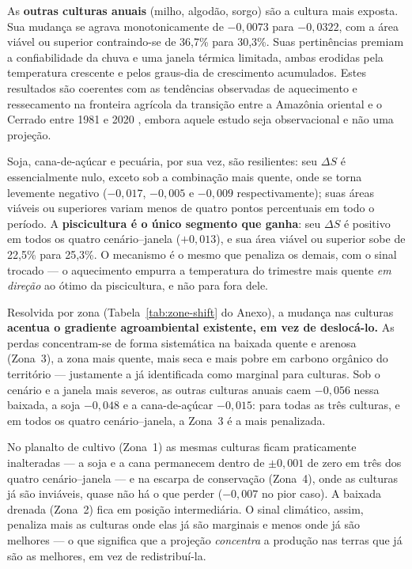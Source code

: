 As \textbf{outras culturas anuais} (milho, algodão, sorgo) são a cultura mais exposta. Sua
mudança se agrava monotonicamente de $-0{,}0073$ para $-0{,}0322$, com a área viável ou
superior contraindo-se de 36,7\% para 30,3\%. Suas pertinências premiam a confiabilidade da
chuva e uma janela térmica limitada, ambas erodidas pela temperatura crescente e pelos
graus-dia de crescimento acumulados. Estes resultados são coerentes com as tendências observadas
de aquecimento e ressecamento na fronteira agrícola da transição entre a Amazônia oriental e o
Cerrado entre 1981 e 2020 \citep[p.~4]{marengo_increased_2022}, embora aquele estudo seja
observacional e não uma projeção.

Soja, cana-de-açúcar e pecuária, por sua vez, são resilientes: seu $\Delta S$ é essencialmente
nulo, exceto sob a combinação mais quente, onde se torna levemente negativo ($-0{,}017$,
$-0{,}005$ e $-0{,}009$ respectivamente); suas áreas viáveis ou superiores variam menos de
quatro pontos percentuais em todo o período. A \textbf{piscicultura é o único segmento que
ganha}: seu $\Delta S$ é positivo em todos os quatro cenário--janela ($+0{,}013$), e sua área
viável ou superior sobe de 22,5\% para 25,3\%. O mecanismo é o mesmo que penaliza os demais,
com o sinal trocado --- o aquecimento empurra a temperatura do trimestre mais quente
\emph{em direção} ao ótimo da piscicultura, e não para fora dele.

Resolvida por zona (Tabela~\ref{tab:zone-shift} do Anexo), a mudança nas culturas
\textbf{acentua o gradiente agroambiental existente, em vez de deslocá-lo.} As perdas
concentram-se de forma sistemática na baixada quente e arenosa (Zona~3), a zona mais quente,
mais seca e mais pobre em carbono orgânico do território --- justamente a já identificada como
marginal para culturas. Sob o cenário e a janela mais severos, as outras culturas anuais caem
$-0{,}056$ nessa baixada, a soja $-0{,}048$ e a cana-de-açúcar $-0{,}015$: para todas as três
culturas, e em todos os quatro cenário--janela, a Zona~3 é a mais penalizada.

No planalto de cultivo (Zona~1) as mesmas culturas ficam praticamente inalteradas --- a soja e a
cana permanecem dentro de $\pm 0{,}001$ de zero em três dos quatro cenário--janela --- e na
escarpa de conservação (Zona~4), onde as culturas já são inviáveis, quase não há o que perder
($-0{,}007$ no pior caso). A baixada drenada (Zona~2) fica em posição intermediária. O sinal
climático, assim, penaliza mais as culturas onde elas já são marginais e menos onde já são
melhores --- o que significa que a projeção \emph{concentra} a produção nas terras que já são
as melhores, em vez de redistribuí-la.

